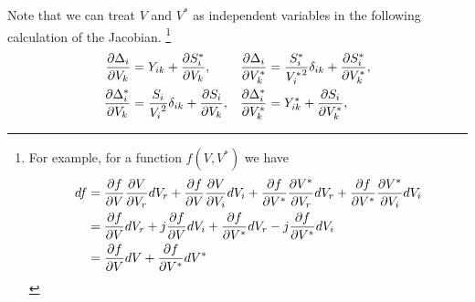 \documentclass[11pt]{article}
\begin{document}
Note that we can treat $V$ and $V^*$ as independent variables in the following calculation of the Jacobian. 
\footnote{
	For example, for a function $f(V, V^*)$ we have
	\begin{align}
	df &= \frac{\partial f}{\partial V} \frac{\partial V}{\partial V_r}dV_r  +  \frac{\partial f}{\partial V} \frac{\partial V}{\partial V_i}dV_i +  \frac{\partial f}{\partial V^*} \frac{\partial V^*}{\partial V_r}dV_r  + \frac{\partial f}{\partial V^*} \frac{\partial V^*}{\partial V_i}dV_i \notag \\
	&= \frac{\partial f}{\partial V} dV_r  + j\frac{\partial f}{\partial V}dV_i +  \frac{\partial f}{\partial V^*}dV_r  - j\frac{\partial f}{\partial V^*} dV_i \notag \\
	&= \frac{\partial f}{\partial V} dV +  \frac{\partial f}{\partial V^*}dV^* \notag
	\end{align}
}
\begin{align}
\frac{\partial \Delta_i}{\partial V_k} &= Y_{ik} + \frac{\partial S^*_i}{\partial V_k}, &\frac{\partial \Delta_i}{\partial V^*_k} &=  \frac{S^*_i}{{V^*_i}^2}\delta_{ik} + \frac{\partial S^*_i}{\partial V^*_k},  \notag \\
\frac{\partial \Delta^*_i}{\partial V_k} &= \frac{S_i}{{V_i}^2}\delta_{ik} + \frac{\partial S_i}{\partial V_k}, &\frac{\partial \Delta^*_i}{\partial V^*_k} &= Y^*_{ik} + \frac{\partial S_i}{\partial V^*_k},
\end{align}
\end{document}
